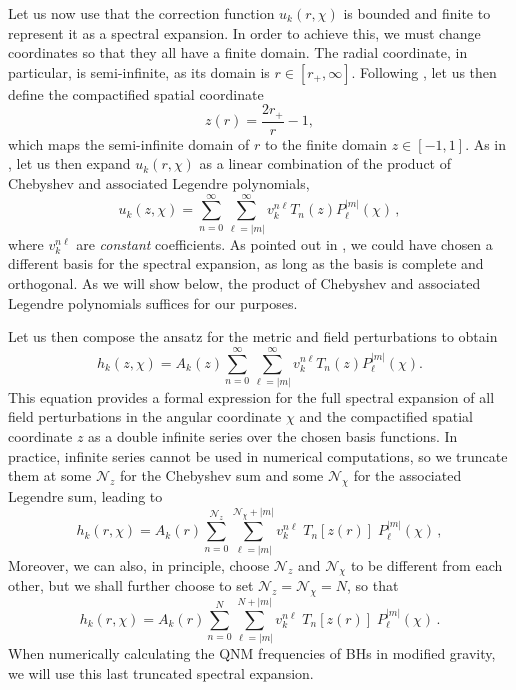 \documentclass[aps,prx,amsmath,floats,floatfix,twocolumn,
  superscriptaddress,nofootinbib,showpacs]{revtex4-1}
\begin{document}
Let us now use that the correction function $u_k(r, \chi)$ is bounded and finite to represent it as a spectral expansion. In order to achieve this, we must change coordinates so that they all have a finite domain. The radial coordinate, in particular, is semi-infinite, as its domain is $r \in [r_+,\infty]$. 
Following \cite{Langlois:2021xzq, Jansen:2017oag, Chung:2023zdq}, let us then define the compactified spatial coordinate
\begin{equation}\label{eq:z}
z(r) = \frac{2r_+}{r} - 1, 
\end{equation}
which maps the semi-infinite domain of $r$ to the finite domain $z \in [-1,1]$. 
As in \cite{Chung:2023wkd, Chung:2023zdq}, let us then expand $u_k(r, \chi)$ as a linear combination of the product of Chebyshev and associated Legendre polynomials, 
\begin{equation}
\label{eq:spectral_decoposition_correction_factor}
u_k (z, \chi) = \sum_{n=0}^{\infty} \sum_{\ell=|m|}^{\infty} v_k^{n \ell}  T_{n}(z) P^{|m|}_{\ell}(\chi)\,,
\end{equation}
where $ v_k^{n \ell}$ are \textit{constant} coefficients.
As pointed out in \cite{Chung:2023zdq, Chung:2023wkd}, we could have chosen a different basis for the spectral expansion, as long as the basis is complete and orthogonal. 
As we will show below, the product of Chebyshev and associated Legendre polynomials suffices for our purposes.  

Let us then compose the ansatz for the metric and field perturbations to obtain
\begin{equation}\label{eq:spectral_decoposition_factorized}
h_k (z, \chi) = A_k(z) \sum_{n=0}^{\infty} \sum_{\ell=|m|}^{\infty} v_k^{n \ell}  T_{n}(z) P^{|m|}_{\ell}(\chi). 
\end{equation}
This equation provides a formal expression for the full spectral expansion of all field perturbations in the angular coordinate $\chi$ and the compactified spatial coordinate $z$ as a double infinite series over the chosen basis functions. 
In practice, infinite series cannot be used in numerical computations, so we truncate them at some $\mathcal{N}_z$ for the Chebyshev sum and some $\mathcal{N}_{\chi}$ for the associated Legendre sum, leading to
\begin{equation}\label{eq:spectral_decoposition_factorized_finite}
h_k (r, \chi) = A_k(r) \sum_{n=0}^{\mathcal{N}_z} \sum_{\ell=|m|}^{\mathcal{N}_{\chi}+|m|} v_k^{n \ell}  \; T_{n}\left[z(r)\right] \; P^{|m|}_{\ell}(\chi)\,,
\end{equation}
Moreover, we can also, in principle, choose $\mathcal{N}_z$ and $\mathcal{N}_{\chi}$ to be different from each other, but we shall further choose to set $\mathcal{N}_z = \mathcal{N}_{\chi} = N$, so that
\begin{equation}\label{eq:spectral_decoposition_factorized_finite}
h_k (r, \chi) = A_k(r) \sum_{n=0}^{N} \sum_{\ell=|m|}^{N+|m|} v_k^{n \ell}  \; T_{n}\left[z(r)\right] \; P^{|m|}_{\ell}(\chi)\,.
\end{equation}
When numerically calculating the QNM frequencies of BHs in modified gravity, we will use this last truncated spectral expansion. 
\end{document}

